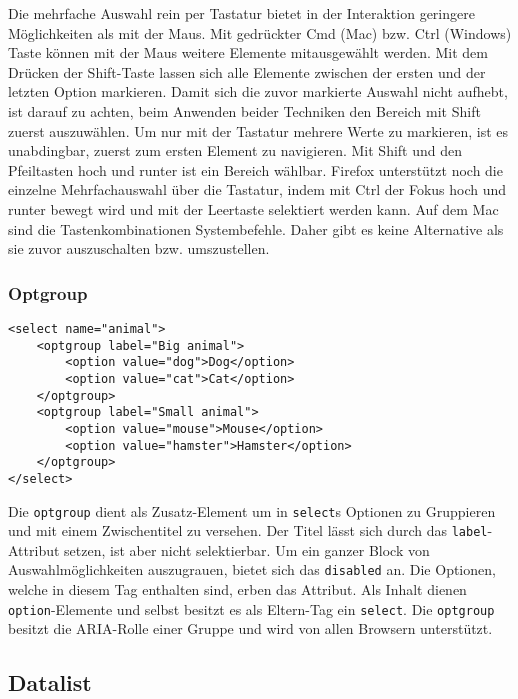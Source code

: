 Die mehrfache Auswahl rein per Tastatur bietet in der Interaktion geringere Möglichkeiten als mit der Maus.
Mit gedrückter Cmd (Mac) bzw. Ctrl (Windows) Taste können mit der Maus weitere Elemente mitausgewählt werden.
Mit dem Drücken der Shift-Taste lassen sich alle Elemente zwischen der ersten und der letzten Option markieren.
Damit sich die zuvor markierte Auswahl nicht aufhebt, ist darauf zu achten, beim Anwenden beider Techniken den Bereich mit Shift zuerst auszuwählen.
Um nur mit der Tastatur mehrere Werte zu markieren, ist es unabdingbar, zuerst zum ersten Element zu navigieren.
Mit Shift und den Pfeiltasten hoch und runter ist ein Bereich wählbar.
Firefox unterstützt noch die einzelne Mehrfachauswahl über die Tastatur, indem mit Ctrl der Fokus hoch und runter bewegt wird und mit der Leertaste selektiert werden kann.
Auf dem Mac sind die Tastenkombinationen Systembefehle.
Daher gibt es keine Alternative als sie zuvor auszuschalten bzw. umszustellen.


\subsubsection{\color{dgray} Optgroup}
\label{sec:optgroup}

\begin{lstlisting}[style = htmlcssjs, caption = Optgroup Example, label = code:OptgroupExample]
<select name="animal">
    <optgroup label="Big animal">
        <option value="dog">Dog</option>
        <option value="cat">Cat</option>
    </optgroup>
    <optgroup label="Small animal">
        <option value="mouse">Mouse</option>
        <option value="hamster">Hamster</option>
    </optgroup>
</select>
\end{lstlisting}

Die \texttt{optgroup} dient als Zusatz-Element um in \texttt{select}s Optionen zu Gruppieren und mit einem Zwischentitel zu versehen.
Der Titel lässt sich durch das \texttt{label}-Attribut setzen, ist aber nicht selektierbar. 
Um ein ganzer Block von Auswahlmöglichkeiten auszugrauen, bietet sich das \texttt{disabled} an.
Die Optionen, welche in diesem Tag enthalten sind, erben das Attribut.
Als Inhalt dienen \texttt{option}-Elemente und selbst besitzt es als Eltern-Tag ein \texttt{select}.
Die \texttt{optgroup} besitzt die ARIA-Rolle einer Gruppe und wird von allen Browsern unterstützt.

\subsection{Datalist}
\label{sec:datalist}

